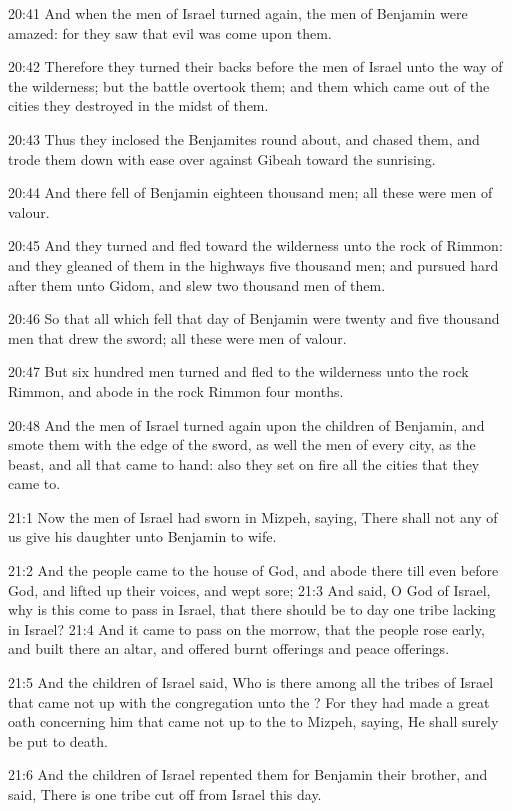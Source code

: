 20:41 And when the men of Israel turned again, the men of Benjamin
were amazed: for they saw that evil was come upon them.

20:42 Therefore they turned their backs before the men of Israel unto
the way of the wilderness; but the battle overtook them; and them
which came out of the cities they destroyed in the midst of them.

20:43 Thus they inclosed the Benjamites round about, and chased them,
and trode them down with ease over against Gibeah toward the
sunrising.

20:44 And there fell of Benjamin eighteen thousand men; all these were
men of valour.

20:45 And they turned and fled toward the wilderness unto the rock of
Rimmon: and they gleaned of them in the highways five thousand men;
and pursued hard after them unto Gidom, and slew two thousand men of
them.

20:46 So that all which fell that day of Benjamin were twenty and five
thousand men that drew the sword; all these were men of valour.

20:47 But six hundred men turned and fled to the wilderness unto the
rock Rimmon, and abode in the rock Rimmon four months.

20:48 And the men of Israel turned again upon the children of
Benjamin, and smote them with the edge of the sword, as well the men
of every city, as the beast, and all that came to hand: also they set
on fire all the cities that they came to.

21:1 Now the men of Israel had sworn in Mizpeh, saying, There shall
not any of us give his daughter unto Benjamin to wife.

21:2 And the people came to the house of God, and abode there till
even before God, and lifted up their voices, and wept sore; 21:3 And
said, O \LORD God of Israel, why is this come to pass in Israel, that
there should be to day one tribe lacking in Israel?  21:4 And it came
to pass on the morrow, that the people rose early, and built there an
altar, and offered burnt offerings and peace offerings.

21:5 And the children of Israel said, Who is there among all the
tribes of Israel that came not up with the congregation unto the \LORD?
For they had made a great oath concerning him that came not up to the
\LORD to Mizpeh, saying, He shall surely be put to death.

21:6 And the children of Israel repented them for Benjamin their
brother, and said, There is one tribe cut off from Israel this day.

